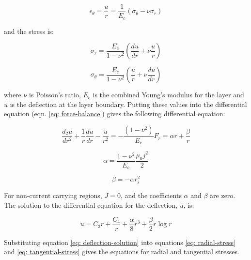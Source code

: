 \documentclass[hidelinks]{article}
\numberwithin{equation}{section}
\begin{document}
    \begin{equation}\label{eq: tangential-strain}
        \epsilon_{\theta} = \frac{u}{r} = \frac{1}{E_c}(\sigma_{\theta}-\nu \sigma_r) 
    \end{equation}

    \noi and the stress is:

    \begin{equation}\label{eq: radial-stress}
        \sigma_r = \frac{E_c}{1-\nu^2}(\frac{du}{dr}+\nu\frac{u}{r})
    \end{equation}

    \begin{equation}\label{eq: tangential-stress}
        \sigma_{\theta} = \frac{E_c}{1-\nu^2}(\frac{u}{r}+\nu\frac{du}{dr})
    \end{equation}

    \noi where $\nu$ is Poisson's ratio, $E_c$ is the combined Young's modulus 
    for the layer and $u$ is the deflection at the layer boundary. Putting these 
    values into the differential equation (eqn. \ref{eq: force-balance}) gives 
    the following differential equation:

    \begin{equation}\label{eq: full-diff-equation}
        \frac{d_2u}{dr^2} + \frac{1}{r}\frac{du}{dr} - \frac{u}{r^2} = 
        -\frac{(1-\nu^2)}{E_c}F_r = \alpha r + \frac{\beta}{r}
    \end{equation}

    \begin{equation}\label{eq: alpha}
        \alpha = \frac{1-\nu^2}{E_c}\frac{\mu_0j^2}{2} 
    \end{equation}

    \begin{equation}\label{eq: beta}
        \beta = -\alpha r_i^2
    \end{equation}

    \noi For non-current carrying regions, $J=0$, and the coefficients $\alpha$ and 
    $\beta$ are zero. The solution to the differential equation for the deflection, 
    $u$, is:

    \begin{equation}\label{eq: deflection-solution}
        u = C_3r + \frac{C_4}{r} + \frac{\alpha}{8}r^3 + \frac{\beta}{2}r\log r
    \end{equation}

    \noi Substituting equation \ref{eq: deflection-solution} into equations 
    \ref{eq: radial-stress} and \ref{eq: tangential-stress} gives the equations 
    for radial and tangential stresses.
\end{document}
